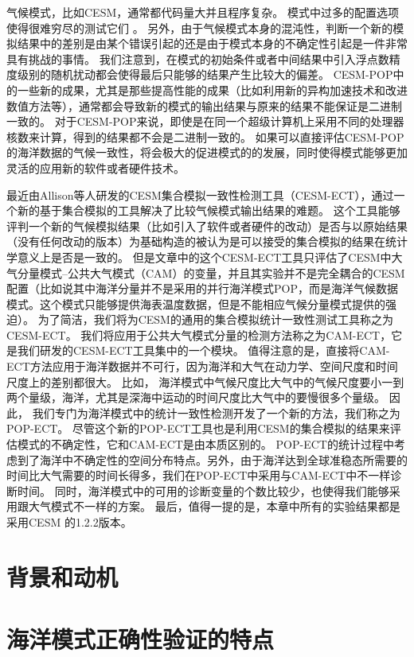   
气候模式，比如CESM，通常都代码量大并且程序复杂。 模式中过多的配置选项使得很难穷尽的测试它们 \citep{clune2011, pipitone2012}。 
另外，由于气候模式本身的混沌性，判断一个新的模拟结果中的差别是由某个错误引起的还是由于模式本身的不确定性引起是一件非常具有挑战的事情。 
我们注意到，在模式的初始条件或者中间结果中引入浮点数精度级别的随机扰动都会使得最后只能够的结果产生比较大的偏差。
CESM-POP中的一些新的成果，尤其是那些提高性能的成果（比如利用新的异构加速技术和改进数值方法等），通常都会导致新的模式的输出结果与原来的结果不能保证是二进制一致的。 
对于CESM-POP来说，即使是在同一个超级计算机上采用不同的处理器核数来计算，得到的结果都不会是二进制一致的。 
如果可以直接评估CESM-POP的海洋数据的气候一致性，将会极大的促进模式的的发展，同时使得模式能够更加灵活的应用新的软件或者硬件技术。 


最近由Allison等人\cite{baker2015}研发的CESM集合模拟一致性检测工具（CESM-ECT），通过一个新的基于集合模拟的工具解决了比较气候模式输出结果的难题。 
这个工具能够评判一个新的气候模拟结果（比如引入了软件或者硬件的改动）是否与以原始结果（没有任何改动的版本）为基础构造的被认为是可以接受的集合模拟的结果在统计学意义上是否是一致的。 
但是文章\cite{baker2015}中的这个CESM-ECT工具只评估了CESM中大气分量模式--公共大气模式（CAM）的变量，并且其实验并不是完全耦合的CESM配置（比如说其中海洋分量并不是采用的并行海洋模式POP，而是海洋气候数据模式。这个模式只能够提供海表温度数据，但是不能相应气候分量模式提供的强迫）。 
为了简洁，我们将为CESM的通用的集合模拟统计一致性测试工具称之为CESM-ECT。 
我们将应用于公共大气模式分量的检测方法称之为CAM-ECT，它是我们研发的CESM-ECT工具集中的一个模块。 
值得注意的是，直接将CAM-ECT方法应用于海洋数据并不可行，因为海洋和大气在动力学、空间尺度和时间尺度上的差别都很大。
比如， 海洋模式中气候尺度比大气中的气候尺度要小一到两个量级，海洋，尤其是深海中运动的时间尺度比大气中的要慢很多个量级。
因此， 我们专门为海洋模式中的统计一致性检测开发了一个新的方法，我们称之为POP-ECT。 
尽管这个新的POP-ECT工具也是利用CESM的集合模拟的结果来评估模式的不确定性，它和CAM-ECT是由本质区别的。 
POP-ECT的统计过程中考虑到了海洋中不确定性的空间分布特点。另外，由于海洋达到全球准稳态所需要的时间比大气需要的时间长得多，我们在POP-ECT中采用与CAM-ECT中不一样诊断时间。 
同时，海洋模式中的可用的诊断变量的个数比较少，也使得我们能够采用跟大气模式不一样的方案。 
最后，值得一提的是，本章中所有的实验结果都是采用CESM 的1.2.2版本。
\section{背景和动机}
\label{sec:verifyBackgroud}

\section{海洋模式正确性验证的特点}
\label{sec:verifyPart1}
